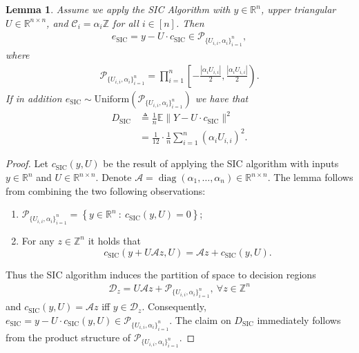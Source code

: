 \documentclass[10pt,a4paper]{amsart}
\newtheorem{lemma}{Lemma}
\def\EE{\mathbb{E}}
\newcommand{\RR}{\mathbb{R}}
\newcommand{\Unif}{\mathrm{Uniform}}
\newcommand{\ZZ}{\mathbb{Z}}
\newcommand{\diag}{\mathop{\mathrm{diag}}}
\newcommand{\m}{\mathcal}
\begin{document}
\begin{lemma}
Assume we apply the SIC Algorithm with $y\in\RR^n$, upper triangular $U\in\RR^{n\times n}$, and $\m{C}_i=\alpha_i\ZZ$ for all $i\in[n]$. Then
\begin{align}
 e_{\mathrm{SIC}}=y-U\cdot c_{\mathrm{SIC}} \in \m{P}_{\{U_{i,i},\alpha_i\}_{i=1}^n},\nonumber
\end{align}
where
\begin{align}
\m{P}_{\{U_{i,i},\alpha_i\}_{i=1}^n}=\prod_{i=1}^n \left[-\frac{|\alpha_i U_{i,i}|}{2},\frac{|\alpha_i U_{i,i}|}{2} \right). \nonumber
\end{align}
If in addition $e_{\mathrm{SIC}}\sim\Unif(\m{P}_{\{U_{i,i},\alpha_i\}_{i=1}^n})$ we have that
\begin{align}
D_{\mathrm{SIC}}&\triangleq\frac{1}{n}\EE\|Y-U\cdot c_{\mathrm{SIC}}\|^2\nonumber\\
&=\frac{1}{12}\cdot\frac{1}{n}\sum_{i=1}^n (\alpha_i U_{i,i})^2.  
\label{eq:DsicError}
\end{align}
\label{lem:FundCellSIC}
\end{lemma}

\begin{proof}
Let $c_{\mathrm{SIC}}(y,U)$ be the result of applying the SIC algorithm with inputs $y\in\RR^n$ and $U\in\RR^{n\times n}$. Denote $\m{A}=\diag(\alpha_1,\ldots,\alpha_n)\in\RR^{n\times n}$. The lemma follows from combining the two following observations:
\begin{enumerate}
\item $\m{P}_{\{U_{i,i},\alpha_i\}_{i=1}^n}=\left\{y\in\RR^n~:~c_{\mathrm{SIC}}(y,U)=0 \right\}$;
\item For any $z\in\ZZ^n$ it holds that $$c_{\mathrm{SIC}}(y+U \m{A} z,U)=\m{A}z+c_{\mathrm{SIC}}(y,U).$$
\end{enumerate}
Thus the SIC algorithm induces the partition of space to decision regions 
\begin{align}
\m{D}_{z}=U\m{A} z+\m{P}_{\{U_{i,i},\alpha_i\}_{i=1}^n},~\forall z\in\ZZ^n    
\end{align}
and $c_{\mathrm{SIC}}(y,U)=\m{A}z$ iff $y\in\m{D}_z$. Consequently, $e_{\mathrm{SIC}}=y-U\cdot c_{\mathrm{SIC}}(y,U)\in \m{P}_{\{U_{i,i},\alpha_i\}_{i=1}^n} $. The claim on $D_{\mathrm{SIC}}$ immediately follows from the product structure of $\m{P}_{\{U_{i,i},\alpha_i\}_{i=1}^n}$.
\end{proof}
\end{document}

